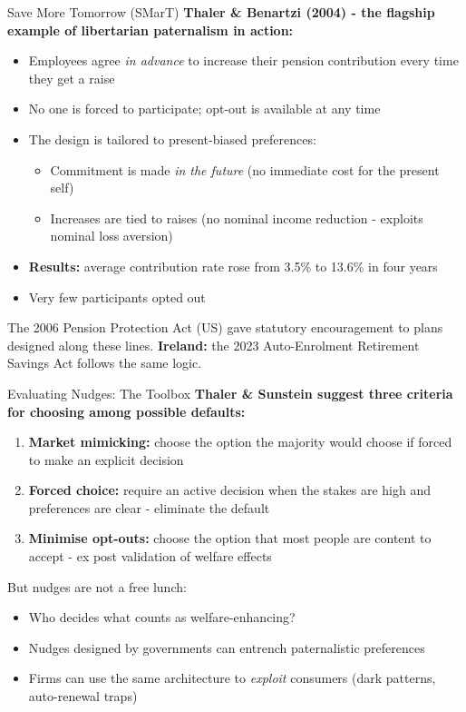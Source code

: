 \documentclass[10pt]{beamer}
\begin{document}
\begin{frame}{Save More Tomorrow (SMarT)}
\textbf{Thaler \& Benartzi (2004) - the flagship example of libertarian paternalism in action:}


\begin{itemize}
\item Employees agree \emph{in advance} to increase their pension contribution every time they get a raise
\item No one is forced to participate; opt-out is available at any time
\item The design is tailored to present-biased preferences:
\begin{itemize}
\item Commitment is made \emph{in the future} (no immediate cost for the present self)
\item Increases are tied to raises (no nominal income reduction - exploits nominal loss aversion)
\end{itemize}
\item \textbf{Results:} average contribution rate rose from 3.5\% to 13.6\% in four years
\item Very few participants opted out
\end{itemize}


\alert{The 2006 Pension Protection Act (US)} gave statutory encouragement to plans designed along these lines.
\textbf{Ireland:} the 2023 Auto-Enrolment Retirement Savings Act follows the same logic.
\end{frame}


\begin{frame}{Evaluating Nudges: The Toolbox}
\textbf{Thaler \& Sunstein suggest three criteria for choosing among possible defaults:}


\begin{enumerate}
\item \textbf{Market mimicking:} choose the option the majority would choose if forced to make an explicit decision

\item \textbf{Forced choice:} require an active decision when the stakes are high and preferences are clear - eliminate the default

\item \textbf{Minimise opt-outs:} choose the option that most people are content to accept - ex post validation of welfare effects
\end{enumerate}


\alert{But nudges are not a free lunch:}
\begin{itemize}
\item Who decides what counts as welfare-enhancing?
\item Nudges designed by governments can entrench paternalistic preferences
\item Firms can use the same architecture to \emph{exploit} consumers (dark patterns, auto-renewal traps)
\end{itemize}
\end{frame}
\end{document}
